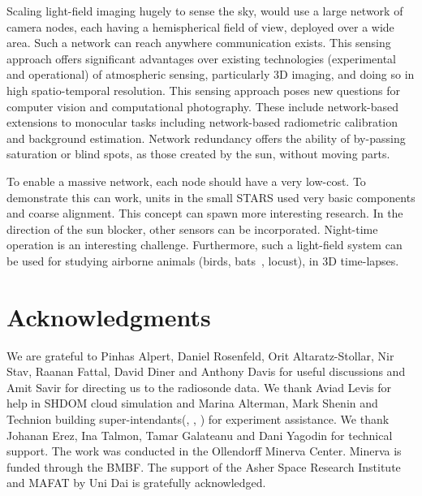 \documentclass[runningheads]{llncs}
\begin{document}
Scaling light-field imaging hugely to sense the sky, would use  a large network of camera nodes, each having a hemispherical field of view, deployed over a wide area. Such a network can reach anywhere communication exists. This sensing approach offers significant advantages over existing technologies (experimental and operational) of atmospheric sensing, particularly  3D imaging, and doing so in high spatio-temporal resolution. This sensing approach poses new questions for computer vision and computational photography. These include network-based extensions to monocular tasks including network-based radiometric calibration and background estimation. Network redundancy offers the ability of by-passing saturation or blind spots, as those created by the sun, without moving parts.

To enable a massive network, each node should have a very low-cost. To demonstrate this can work, units in the small STARS used very basic components and coarse alignment. This concept can spawn more interesting research. In the direction of the sun blocker, other sensors can be incorporated. Night-time operation is an interesting challenge. Furthermore, such a light-field system can be used for studying airborne animals (birds, bats~\cite{bats2010}, locust), in 3D time-lapses.


\section{Acknowledgments}
\label{sec:acknow}
We are grateful to Pinhas Alpert, Daniel Rosenfeld, Orit Altaratz-Stollar, Nir Stav, Raanan Fattal, David Diner and Anthony Davis for useful discussions and Amit Savir for directing us to the radiosonde data.
We thank Aviad Levis for help in SHDOM cloud simulation and Marina Alterman, Mark Shenin and Technion building super-intendants(, , ) for experiment assistance. We thank Johanan Erez, Ina Talmon, Tamar Galateanu and Dani Yagodin for technical support.
The work was conducted in the Ollendorff Minerva Center. Minerva is funded through the BMBF. The support of the Asher Space Research Institute and MAFAT by Uni Dai is gratefully acknowledged.







\end{document}
